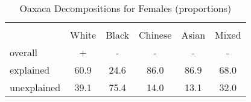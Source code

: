 \begin{table}[htbp]\centering
\caption{Oaxaca Decompositions for Females (proportions)}
\begin{tabular}{l*{5}{c}}
\hline\hline
          &         &         &         &         &         \\
          &    White&    Black&  Chinese&    Asian&    Mixed\\
\hline
overall   &     +    &      -   &      -   &    -     &     -    \\
explained &     60.9&     24.6&     86.0&     86.9&     68.0\\
unexplained&     39.1&     75.4&     14.0&     13.1&     32.0\\
\hline\hline
\end{tabular}
\end{table}
